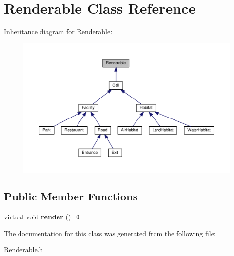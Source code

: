 \hypertarget{classRenderable}{}\section{Renderable Class Reference}
\label{classRenderable}


Inheritance diagram for Renderable\+:
\nopagebreak
\begin{figure}[H]
\begin{center}
\leavevmode
\includegraphics[width=350pt]{classRenderable__inherit__graph}
\end{center}
\end{figure}
\subsection*{Public Member Functions}
\begin{DoxyCompactItemize}
\item 
virtual void {\bfseries render} ()=0\hypertarget{classRenderable_a7d02709d871bd2bde97d41d933df5adf}{}\label{classRenderable_a7d02709d871bd2bde97d41d933df5adf}

\end{DoxyCompactItemize}


The documentation for this class was generated from the following file\+:\begin{DoxyCompactItemize}
\item 
Renderable.\+h\end{DoxyCompactItemize}
